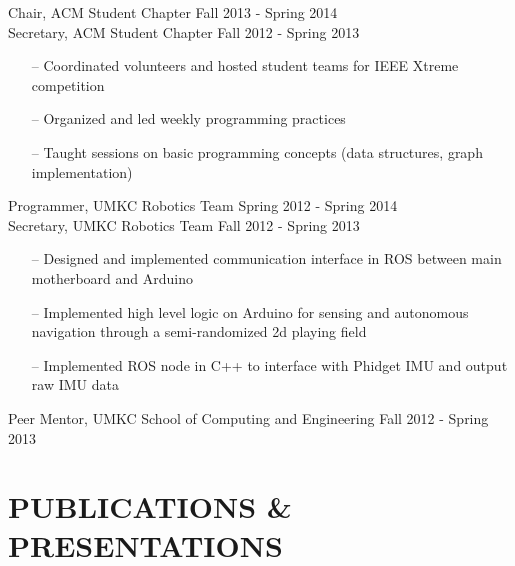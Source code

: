 \documentclass[line,margin]{res}
\begin{document}
\begin{resume}
		
		
		Chair, ACM Student Chapter \hfill Fall 2013 - Spring 2014\\
		Secretary, ACM Student Chapter \hfill Fall 2012 - Spring 2013 
		         \begin{itemize} [leftmargin=5mm]  \itemsep -2pt %
                 \item[--] Coordinated volunteers and hosted student teams for IEEE Xtreme competition 
                 \item[--] Organized and led weekly programming practices
                 \item[--] Taught sessions on basic programming concepts (data structures, graph implementation)
                 \end{itemize} 

		
		Programmer, UMKC Robotics Team \hfill Spring 2012 - Spring 2014\\ 
		Secretary, UMKC Robotics Team \hfill  Fall 2012 - Spring 2013 	
		\begin{itemize} [leftmargin=5mm]  \itemsep -2pt %
                 \item[--] Designed and implemented communication interface in ROS between main motherboard and Arduino 
				 \item[--] Implemented high level logic on Arduino for sensing and autonomous navigation through a semi-randomized 2d playing field
                 \item[--] Implemented ROS node in C++ to interface with Phidget IMU and output raw IMU data
                 \end{itemize} 
		
		Peer Mentor, UMKC School of Computing and Engineering \hfill Fall 2012 - Spring 2013 

\section{PUBLICATIONS \& PRESENTATIONS }


\end{resume}
\end{document}
